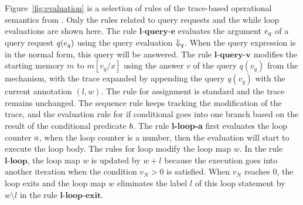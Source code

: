 Figure~\ref{fig:evaluation} is a selection of rules of the trace-based operational semantics from .
Only the rules related to query requests and the while loop evaluations are shown here.
The rule $\textbf{l-query-e}$ evaluates the argument $e_q$ of a query request $q(e_q)$ using the query evaluation $\Downarrow_q$.
When the query expression is in the normal form, this query will be answered.
The rule $\textbf{l-query-v}$ modifies the starting memory $m$ to $m[v_q/x]$ using the answer $v$ of the query $q(v_q)$ from the mechanism, with the trace expanded by appending the query $q(v_q)$ with the current annotation $(l,w)$.
The rule for assignment is standard and the trace remains unchanged.
The sequence rule keeps tracking the modification of the trace, and the evaluation rule for if conditional goes into one branch based on the result of the conditional predicate $b$. 
The rule \textbf{l-loop-a} first evaluates the loop counter $a$, when the loop counter is a number, then the evaluation will start to execute the loop body.
The rules for loop modify the loop map $w$. In the rule $\textbf{l-loop}$, the loop map $w$ is updated by $w + l$ because the execution goes into another iteration when the condition $v_N >0$ is satisfied.
When $v_N$ reaches $0$, the loop exits and the loop map $w$ eliminates the label $l$ of this loop statement by $w \setminus l$ in the rule $\textbf{l-loop-exit}$. 
% 
